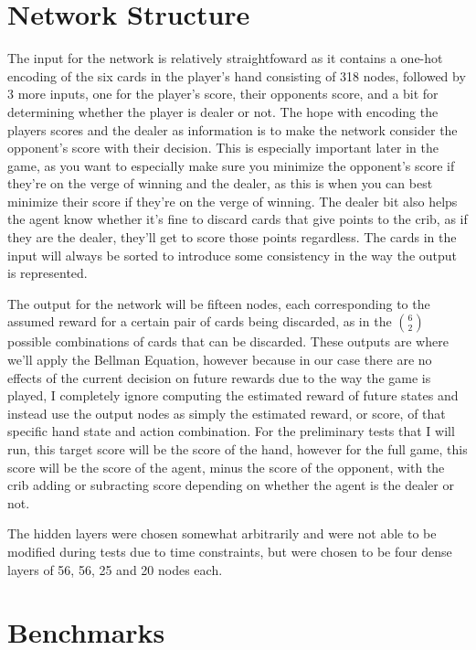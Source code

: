 \documentclass[]{article}
\begin{document}
\section{Network Structure}

The input for the network is relatively straightfoward as it contains a one-hot encoding of the six cards in the player's hand consisting of 318 nodes, followed by 3 more inputs, one for the player's score, their opponents score, and a bit for determining whether the player is dealer or not. The hope with encoding the players scores and the dealer as information is to make the network consider the opponent's score with their decision. This is especially important later in the game, as you want to especially make sure you minimize the opponent's score if they're on the verge of winning and the dealer, as this is when you can best minimize their score if they're on the verge of winning. The dealer bit also helps the agent know whether it's fine to discard cards that give points to the crib, as if they are the dealer, they'll get to score those points regardless. The cards in the input will always be sorted to introduce some consistency in the way the output is represented. 

The output for the network will be fifteen nodes, each corresponding to the assumed reward for a certain pair of cards being discarded, as in the $6 \choose 2$ possible combinations of cards that can be discarded. These outputs are where we'll apply the Bellman Equation, however because in our case there are no effects of the current decision on future rewards due to the way the game is played, I completely ignore computing the estimated reward of future states and instead use the output nodes as simply the estimated reward, or score, of that specific hand state and action combination. For the preliminary tests that I will run, this target score will be the score of the hand, however for the full game, this score will be the score of the agent, minus the score of the opponent, with the crib adding or subracting score depending on whether the agent is the dealer or not.

The hidden layers were chosen somewhat arbitrarily and were not able to be modified during tests due to time constraints, but were chosen to be four dense layers of 56, 56, 25 and 20 nodes each. 

\section{Benchmarks}
\end{document}
